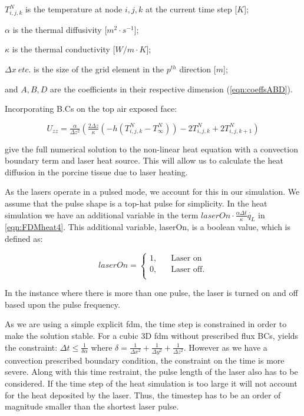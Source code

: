 	\indent $T^N_{i,j,k}$ is the temperature at node $i,j,k$ at the current time step [$K$];
	
	\indent $\alpha$ is the thermal diffusivity [$m^2\cdot s^{-1}$];
	
	\indent $\kappa$ is the thermal conductivity [$W/m\cdot K$];
	
	\indent $\Delta x\ etc.$ is the size of the grid element in the $p^{th}$ direction [$m$];
	
	\indent and $A, B,D$ are the coefficients in their respective dimension (\cref{eqn:coeffsABD}).

	\medskip
	
Incorporating B.Cs on the top air exposed face:

\begin{equation}
U_{zz} = \tfrac{\alpha}{\Delta z^2} (\tfrac{2 \Delta z}{\kappa} (-h(T^N_{i,j,k}-T^N_\infty) ) -2 T^N_{i,j,k} + 2T^N_{i,j,k+1})\label{eqn:bceqn} 
\end{equation}

 give the full numerical solution to the non-linear heat equation with a convection boundary term and laser heat source. This will allow us to calculate the heat diffusion in the porcine tissue due to laser heating.

\medskip

As the lasers operate in a pulsed mode, we account for this in our simulation. We assume that the pulse shape is a top-hat pulse for simplicity. In the heat simulation we have an additional variable in the term $laserOn\cdot\tfrac{\alpha \Delta t}{\kappa}\dot{q_L}$ in \cref{eqn:FDMheat4}. This additional variable, laserOn, is a boolean value, which is defined as:

\[   
laserOn = 
     \begin{cases}
       \text{1,} &\quad\text{Laser on}\\
       \text{0,} &\quad\text{Laser off}.\\
     \end{cases}
\]

In the instance where there is more than one pulse, the laser is turned on and off based upon the pulse frequency.

\medskip

As we are using a simple explicit \gls{fdm}, the time step is constrained in order to make the solution stable. For a cubic 3D \gls{fdm} without prescribed flux BCs, yields the constraint: $\Delta t \leq \tfrac{1}{\delta \alpha}$ where $\delta=\tfrac{1}{\Delta x^2}+\tfrac{1}{\Delta y^2}+\tfrac{1}{\Delta z^2}$. However as we have a convection prescribed boundary condition, the constraint on the time is more severe. Along with this time restraint, the pulse length of the laser also has to be considered. If the time step of the heat simulation is too large it will not account for the heat deposited by the laser. Thus, the timestep has to be an order of magnitude smaller than the shortest laser pulse.

